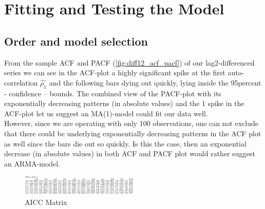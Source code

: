 \documentclass[11pt,a4paper]{article}
\begin{document}

\section{Fitting and Testing the Model}
\label{sec:FitTestModel}

\subsection{Order and model selection}

From the sample ACF and PACF (\cref{fig:diff12_acf_pacf}) of our lag2-differenced series we can see in the ACF-plot a highly significant spike at the first auto-correlation $\hat{\rho_1}$ and the following bars dying out quickly, lying inside the 95percent - confidence – bounds.
The combined view of the PACF-plot with its exponentially decreasing patterns (in absolute values) and the 1 spike in the ACF-plot let us suggest an MA(1)-model could fit our data well.\\
However, since we are operating with only 100 observations, one can not exclude that there could be underlying exponentially decreasing patterns in the ACF plot as well since the bars die out so quickly.
Is this the case, then an exponential decrease (in absolute values) in both ACF and PACF plot would rather suggest an ARMA-model.

\begin{figure}
    \centering
    \includegraphics[width=0.5\textwidth]{aicc_matrix}
    \caption{AICC Matrix}
    \label{fig:aicc_matrix}
\end{figure}
\end{document}
